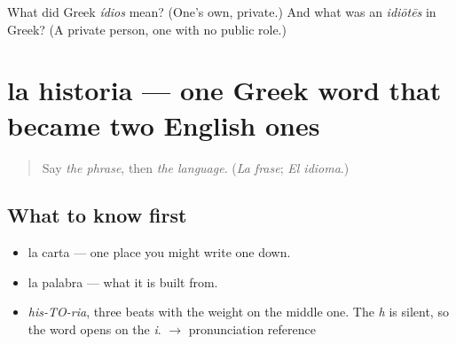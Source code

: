 \begin{tcolorbox}[breakable,colback=teal!4,colframe=teal!35!black,title={Before you move on}]
What did Greek \emph{ídios} mean? (One's own, private.) And what was an \emph{idiōtēs} in Greek? (A private person, one with no public role.)
\end{tcolorbox}
\section[la historia]{la historia — one Greek word that became two English ones}

\label{lesson:ES-C377-historia}



\begin{quote}
Say \emph{the phrase}, then \emph{the language}. (\emph{La frase}; \emph{El idioma}.)
\end{quote}

\subsection*{What to know first}
\begin{itemize}
\raggedright
  \item la carta — one place you might write one down.
  \item la palabra — what it is built from.
\end{itemize}

\begin{sounds}
\begin{itemize}
\raggedright
  \item \emph{his-TO-ria}, three beats with the weight on the middle one. The \emph{h} is silent, so the word opens on the \emph{i}. $\to$ pronunciation reference
\end{itemize}
\end{sounds}

